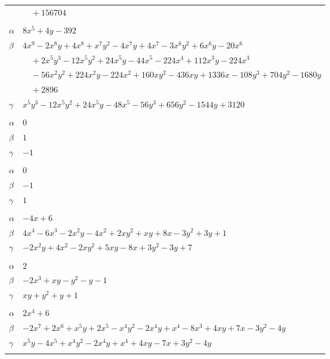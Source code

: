 \documentclass[11pt]{article}
\begin{document}
\begin{longtable}{@{}ll@{}}
 & $\quad +156704$\\
\addlinespace[3pt]
\multicolumn{2}{@{}l}{$\{i,j\}=\{18,34\}$, $k_{ij}=2^{7}\cdot 3\cdot 11$}\\
$\alpha$ & $8x^{5}+4y-392$\\
$\beta$ & $4x^{9}-2x^{8}y+4x^{8}+x^{7}y^{2}-4x^{7}y+4x^{7}-3x^{6}y^{2}+6x^{6}y-20x^{6}$\\
 & $\quad +2x^{5}y^{3}-12x^{5}y^{2}+24x^{5}y-44x^{5}-224x^{4}+112x^{3}y-224x^{3}$\\
 & $\quad -56x^{2}y^{2}+224x^{2}y-224x^{2}+160xy^{2}-436xy+1336x-108y^{3}+704y^{2}-1680y$\\
 & $\quad +2896$\\
$\gamma$ & $x^{5}y^{3}-12x^{5}y^{2}+24x^{5}y-48x^{5}-56y^{3}+656y^{2}-1544y+3120$\\
\addlinespace[3pt]
\multicolumn{2}{@{}l}{$\{i,j\}=\{19,26\}$, $k_{ij}=2$}\\
$\alpha$ & $0$\\
$\beta$ & $1$\\
$\gamma$ & $-1$\\
\addlinespace[3pt]
\multicolumn{2}{@{}l}{$\{i,j\}=\{19,27\}$, $k_{ij}=2$}\\
$\alpha$ & $0$\\
$\beta$ & $-1$\\
$\gamma$ & $1$\\
\addlinespace[3pt]
\multicolumn{2}{@{}l}{$\{i,j\}=\{19,30\}$, $k_{ij}=2\cdot 5$}\\
$\alpha$ & $-4x+6$\\
$\beta$ & $4x^{4}-6x^{3}-2x^{2}y-4x^{2}+2xy^{2}+xy+8x-3y^{2}+3y+1$\\
$\gamma$ & $-2x^{2}y+4x^{2}-2xy^{2}+5xy-8x+3y^{2}-3y+7$\\
\addlinespace[3pt]
\multicolumn{2}{@{}l}{$\{i,j\}=\{19,31\}$, $k_{ij}=2\cdot 5$}\\
$\alpha$ & $2$\\
$\beta$ & $-2x^{3}+xy-y^{2}-y-1$\\
$\gamma$ & $xy+y^{2}+y+1$\\
\addlinespace[3pt]
\multicolumn{2}{@{}l}{$\{i,j\}=\{22,24\}$, $k_{ij}=2^{3}\cdot 3$}\\
$\alpha$ & $2x^{4}+6$\\
$\beta$ & $-2x^{7}+2x^{6}+x^{5}y+2x^{5}-x^{4}y^{2}-2x^{4}y+x^{4}-8x^{3}+4xy+7x-3y^{2}-4y$\\
$\gamma$ & $x^{5}y-4x^{5}+x^{4}y^{2}-2x^{4}y+x^{4}+4xy-7x+3y^{2}-4y$\\
\addlinespace[3pt]
\multicolumn{2}{@{}l}{$\{i,j\}=\{22,26\}$, $k_{ij}=2^{5}\cdot 5\cdot 7$}\\

\end{longtable}
\end{document}
